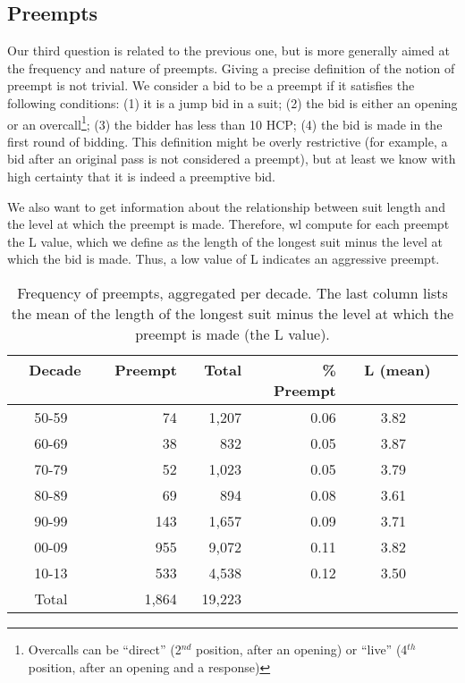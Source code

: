 \documentclass{llncs}
\begin{document}
\subsection{Preempts}

Our third question is related to the previous one, but is more
generally aimed at the frequency and nature of preempts. Giving a
precise definition of the notion of preempt is not trivial. We
consider a bid to be a 
preempt if it satisfies the following conditions: (1) it is a jump
bid in a suit; (2) the bid is either an opening or an
overcall\footnote{%
Overcalls can be ``direct'' (2$^{nd}$ position, after an opening) or ``live'' (4$^{th}$ position,
after an opening and a response)}; 
(3) the bidder has less than 10 HCP; (4) the bid is made in the first
round of bidding.  This definition might be overly restrictive (for
example, a bid after an original pass is not considered a preempt),
but at least we know with high certainty that it is indeed a
preemptive bid. 

We also want to get information about the relationship between suit
length and the level at which the preempt is made. Therefore, wl
compute for each preempt the L value, which we define as the length
of the longest  suit minus the level at which the bid is made.  Thus,
a low value of L indicates an aggressive preempt.  

\begin{table}
\caption{Frequency of preempts, aggregated per decade. The last column
lists the mean of the length of the longest suit minus the level at
which the preempt is made (the L value).}
\centering\footnotesize
\label{tbl:preempt}
\begin{tabular}{|c|r|r|r|c|c|}
\hline
\bf \ Decade \ & \bf Preempt \ & \bf Total  \ & 
\bf \% Preempt & \bf \ L (mean) \  \\ 
\hline\hline
50-59 & 74 & 1,207 & 0.06 & 3.82 \\ 
60-69 & 38 & 832& 0.05 & 3.87 \\
70-79 & 52 & 1,023 & 0.05 & 3.79 \\
80-89 & 69 & 894 & 0.08 & 3.61 \\
90-99 & 143 & 1,657 & 0.09 & 3.71 \\
00-09 & 955 & 9,072 & 0.11 & 3.82 \\ 
10-13 & 533 & 4,538 & 0.12 & 3.50 \\
\hline
Total  & 1,864 & 19,223 &  & \\ 
\hline
\end{tabular}
\end{table}
\end{document}
